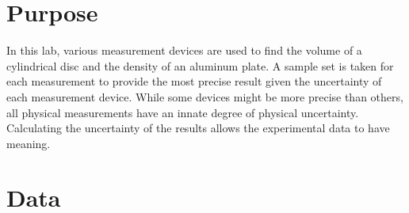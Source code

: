 \documentclass[12pt]{article}
\begin{document}

\newpage
\tableofcontents
\newpage
\section{Purpose}
In this lab, various measurement devices are used to find the volume of a cylindrical disc and the density of an aluminum plate. A sample set is taken for each measurement to provide the most precise result given the uncertainty of each measurement device. While some devices might be more precise than others, all physical measurements have an innate degree of physical uncertainty. Calculating the uncertainty of the results allows the experimental data to have meaning. 
\newpage
\section{Data}

\newpage
\end{document}
